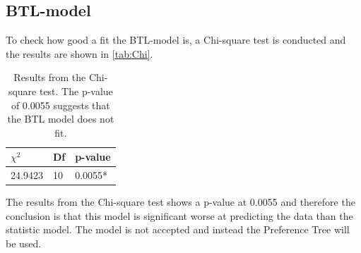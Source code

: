 \subsection*{BTL-model}
To check how good a fit the BTL-model is, a Chi-square test is conducted and the results are shown in \autoref{tab:Chi}. 
%
\begin{table}[H]
\centering
\begin{tabular}{@{}lll@{}}
\toprule
$\chi^{2}$   & Df  & p-value \\ \midrule
24.9423      & 10  & 0.0055* \\ \bottomrule
\end{tabular}
\caption{Results from the Chi-square test. The p-value of 0.0055 suggests that the BTL model does not fit.}
\label{tab:Chi}
\end{table} 
\noindent 
The results from the Chi-square test shows a p-value at 0.0055 and therefore the conclusion is that this model is significant worse at predicting the data than the statistic model. The model is not accepted and instead the Preference Tree will be used. 

